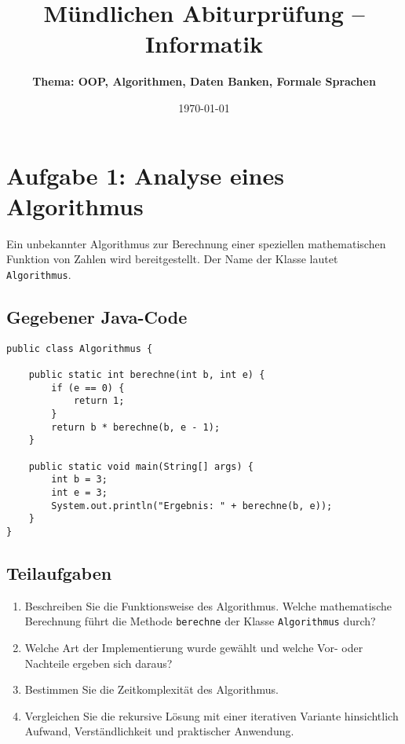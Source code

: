 \documentclass[a4paper,12pt]{article}
\begin{document}
	
	\title{\textbf{Mündlichen Abiturprüfung -- Informatik}}
	\author{\textbf{Thema: OOP, Algorithmen, Daten Banken, Formale Sprachen}}
	\date{\today}
	\maketitle
	
	\section*{Aufgabe 1: Analyse eines Algorithmus}
	
	Ein unbekannter Algorithmus zur Berechnung einer speziellen mathematischen Funktion von Zahlen wird bereitgestellt. Der Name der Klasse lautet \texttt{Algorithmus}.
	
	\subsection*{Gegebener Java-Code}
	
\begin{verbatim}
public class Algorithmus {
	
	public static int berechne(int b, int e) {
		if (e == 0) {
			return 1;
		}
		return b * berechne(b, e - 1);
	}
	
	public static void main(String[] args) {
		int b = 3;
		int e = 3;
		System.out.println("Ergebnis: " + berechne(b, e));
	}
}
\end{verbatim}
	
	\subsection*{Teilaufgaben}
	
	\begin{enumerate}
		\item Beschreiben Sie die Funktionsweise des Algorithmus. Welche mathematische Berechnung führt die Methode \texttt{berechne} der Klasse \texttt{Algorithmus} durch?
		
		\item Welche Art der Implementierung wurde gewählt und welche Vor- oder Nachteile ergeben sich daraus?
		
		\item Bestimmen Sie die Zeitkomplexität des Algorithmus.
		
		\item Vergleichen Sie die rekursive Lösung mit einer iterativen Variante hinsichtlich Aufwand, Verständlichkeit und praktischer Anwendung.
	\end{enumerate}
	
\end{document}
